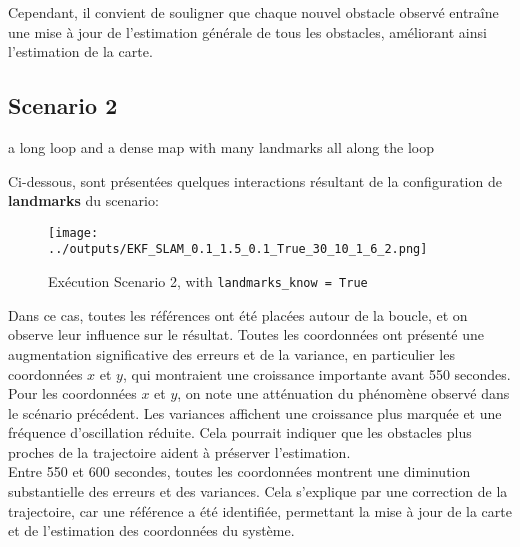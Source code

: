 \documentclass[../CSC_5RO12_TA_TP4.tex]{subfiles}
\begin{document}
\noindent Cependant, il convient de souligner que chaque nouvel obstacle observé entraîne une mise à jour de l'estimation générale de tous les obstacles, améliorant ainsi l'estimation de la carte.
\subsection{Scenario 2}
\begin{definition}
    a long loop and a dense map with many landmarks all along the loop
\end{definition}
\noindent Ci-dessous, sont présentées quelques interactions résultant de la configuration de \textbf{landmarks} du scenario:
\begin{figure}[H]
    \centering
	\texttt{[image: ../outputs/EKF\_SLAM\_0.1\_1.5\_0.1\_True\_30\_10\_1\_6\_2.png]}
	\caption{Exécution Scenario 2, with \texttt{landmarks\_know = True}}
	\label{}
\end{figure}
\noindent Dans ce cas, toutes les références ont été placées autour de la boucle, et on observe leur influence sur le résultat. Toutes les coordonnées ont présenté une augmentation significative des erreurs et de la variance, en particulier les coordonnées $x$ et $y$, qui montraient une croissance importante avant 550 secondes.\\

\noindent Pour les coordonnées $x$ et $y$, on note une atténuation du phénomène observé dans le scénario précédent. Les variances affichent une croissance plus marquée et une fréquence d'oscillation réduite. Cela pourrait indiquer que les obstacles plus proches de la trajectoire aident à préserver l'estimation.\\

\noindent Entre 550 et 600 secondes, toutes les coordonnées montrent une diminution substantielle des erreurs et des variances. Cela s'explique par une correction de la trajectoire, car une référence a été identifiée, permettant la mise à jour de la carte et de l'estimation des coordonnées du système.
\end{document}
